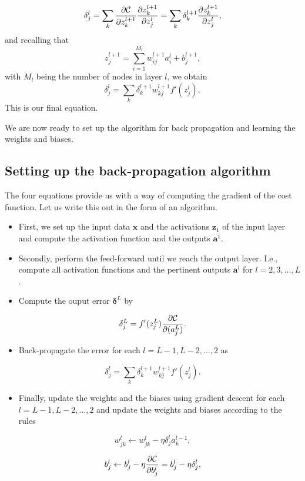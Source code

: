 \documentclass[%
oneside,                 %
final,                   %
10pt]{article}
\newenvironment{summary_mdfboxadmon}[1][]{
\begin{summary_mdfboxmdframed}[frametitle=#1]
}
{
\end{summary_mdfboxmdframed}
}
\begin{document}
\[
\delta_j^l =\sum_k \frac{\partial {\cal C}}{\partial z_k^{l+1}}\frac{\partial z_k^{l+1}}{\partial z_j^{l}}=\sum_k \delta_k^{l+1}\frac{\partial z_k^{l+1}}{\partial z_j^{l}},
\]
and recalling that
\[
z_j^{l+1} = \sum_{i=1}^{M_{l}}w_{ij}^{l+1}a_i^{l}+b_j^{l+1},
\]
with $M_l$ being the number of nodes in layer $l$, we obtain
\[
\delta_j^l =\sum_k \delta_k^{l+1}w_{kj}^{l+1}f'(z_j^l),
\]
This is our final equation.

We are now ready to set up the algorithm for back propagation and learning the weights and biases.

\subsection{Setting up the back-propagation algorithm}



The four equations  provide us with a way of computing the gradient of the cost function. Let us write this out in the form of an algorithm.


\begin{summary_mdfboxadmon}[Summary]
\begin{itemize}
\item First, we set up the input data $\boldsymbol{x}$ and the activations $\boldsymbol{z}_1$ of the input layer and compute the activation function and the outputs $\boldsymbol{a}^1$.

\item Secondly, perform the feed-forward until we reach the output layer. I.e., compute all activation functions and the pertinent outputs $\boldsymbol{a}^l$ for $l=2,3,\dots,L$.

\item Compute the ouput error $\boldsymbol{\delta}^L$ by
\end{itemize}

\noindent
\[
\delta_j^L = f'(z_j^L)\frac{\partial {\cal C}}{\partial (a_j^L)}.
\]

\begin{itemize}
\item Back-propagate the error for each $l=L-1,L-2,\dots,2$ as
\end{itemize}

\noindent
\[
\delta_j^l = \sum_k \delta_k^{l+1}w_{kj}^{l+1}f'(z_j^l).
\]

\begin{itemize}
\item Finally, update the weights and the biases using gradient descent for each $l=L-1,L-2,\dots,2$ and update the weights and biases according to the rules
\end{itemize}

\noindent
\[
w_{jk}^l\leftarrow  w_{jk}^l- \eta \delta_j^la_k^{l-1},
\]

\[
b_j^l \leftarrow b_j^l-\eta \frac{\partial {\cal C}}{\partial b_j^l}=b_j^l-\eta \delta_j^l,
\]
\end{summary_mdfboxadmon} %
\end{document}
